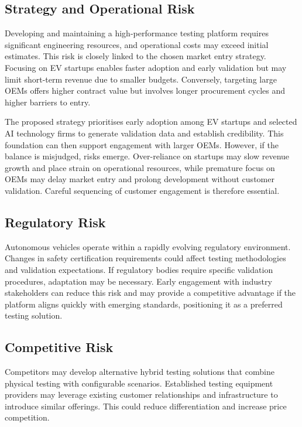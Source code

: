 \subsection{Strategy and Operational Risk}

Developing and maintaining a high-performance testing platform requires significant engineering resources, and operational costs may exceed initial estimates. This risk is closely linked to the chosen market entry strategy. Focusing on EV startups enables faster adoption and early validation but may limit short-term revenue due to smaller budgets. Conversely, targeting large OEMs offers higher contract value but involves longer procurement cycles and higher barriers to entry.

The proposed strategy prioritises early adoption among EV startups and selected AI technology firms to generate validation data and establish credibility. This foundation can then support engagement with larger OEMs. However, if the balance is misjudged, risks emerge. Over-reliance on startups may slow revenue growth and place strain on operational resources, while premature focus on OEMs may delay market entry and prolong development without customer validation. Careful sequencing of customer engagement is therefore essential.

\subsection{Regulatory Risk}

Autonomous vehicles operate within a rapidly evolving regulatory environment. Changes in safety certification requirements could affect testing methodologies and validation expectations. If regulatory bodies require specific validation procedures, adaptation may be necessary. Early engagement with industry stakeholders can reduce this risk and may provide a competitive advantage if the platform aligns quickly with emerging standards, positioning it as a preferred testing solution.

\subsection{Competitive Risk}

Competitors may develop alternative hybrid testing solutions that combine physical testing with configurable scenarios. Established testing equipment providers may leverage existing customer relationships and infrastructure to introduce similar offerings. This could reduce differentiation and increase price competition.


